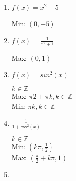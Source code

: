 \documentclass[12pt,a4paper]{scrreprt}
\newcommand{\Z}{\mathds{Z}}
\begin{document}
\begin{enumerate}
\begin{enumerate}
\item
$f(x)=x^2-5$

Min: $(0,-5)$

\item
$f(x)=\frac{1}{x^2+1}$

Max: $(0,1)$

\item

$f(x)=sin^2(x)$

$k \in \Z$ \\
Max: ${\pi}{2}+\pi k, k \in \Z$ \\
Min: $\pi k , k \in \Z$

\item

$\frac{1}{1+cos^2(x)}$

$k \in \Z$ \\
Min: $( k \pi, \frac{1}{2} )$ \\
Max: $( \frac{\pi}{2} + k \pi, 1 )$

\item



\end{enumerate}

\end{enumerate}
\end{document}
